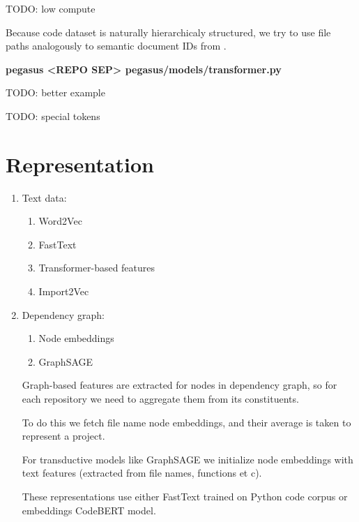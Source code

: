 \documentclass[11pt]{report}
\begin{document}
TODO: low compute

Because code dataset is naturally hierarchicaly structured, we try to use file paths analogously to semantic document IDs from \cite{differentiable_search_index}.

\textbf{pegasus <REPO SEP> pegasus/models/transformer.py 
}

TODO: better example 

TODO: special tokens

\section{Representation}

\begin{enumerate}

\item Text data:

\begin{enumerate}

\item Word2Vec

\item FastText

\item Transformer-based features

\item Import2Vec

\end{enumerate}



\item Dependency graph:

\begin{enumerate}

\item Node embeddings

\item GraphSAGE

\end{enumerate}



Graph-based features are extracted for nodes in dependency graph, so for each repository we need to aggregate them from its constituents.

To do this we fetch file name node embeddings, and their average is taken to represent a project.

For transductive models like GraphSAGE we initialize node embeddings with text features (extracted from file names, functions et c).

These representations use either FastText trained on Python code corpus or embeddings CodeBERT model.

\end{enumerate}
\end{document}
